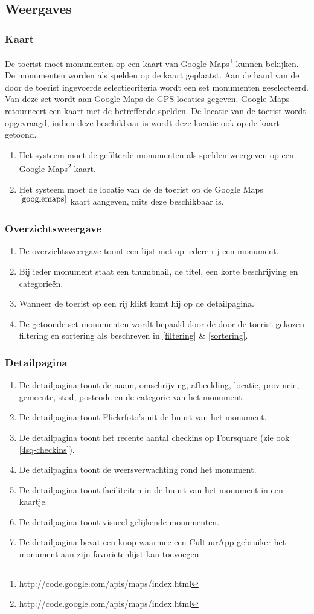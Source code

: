\documentclass[a4paper,10pt]{article}
\newcommand{\rsubsection}[1]{
\subsection{#1}\label{sec:sub:#1}
}
\newcommand{\rsubsubsection}[1]{
\subsubsection{#1}\label{sec:sub:sub:#1}
}
\begin{document}
	\rsubsection{Weergaves}
\rsubsubsection{Kaart}
			De toerist moet monumenten op een kaart van Google Maps\footnote{http://code.google.com/apis/maps/index.html} kunnen bekijken. De monumenten worden als spelden op de kaart geplaatst. Aan de hand van de door de toerist ingevoerde selectiecriteria wordt een set monumenten geselecteerd. Van deze set wordt aan Google Maps de GPS locaties gegeven. Google Maps retourneert een kaart met de betreffende spelden. De locatie van de toerist wordt opgevraagd, indien deze beschikbaar is wordt deze locatie ook op de kaart getoond.
			\begin{enumerate}
				\item Het systeem moet de gefilterde monumenten als spelden weergeven op een Google Maps\footnote{\label{googlemaps} http://code.google.com/apis/maps/index.html} kaart.
				\item Het systeem moet de locatie van de de toerist op de Google Maps$^{\ref{googlemaps}}$ kaart aangeven, mits deze beschikbaar is. 
			\end{enumerate}
		\rsubsubsection{Overzichtsweergave} \label{sec:views-detail}
\begin{enumerate}
				\item De overzichtsweergave toont een lijst met op iedere rij een monument.
\item Bij ieder monument staat een thumbnail, de titel, een korte beschrijving en categorie\"en.
\item Wanneer de toerist op een rij klikt komt hij op de detailpagina.
\item De getoonde set monumenten wordt bepaald door de door de toerist gekozen filtering en sortering als beschreven in \ref{filtering} \& \ref{sortering}.
			\end{enumerate}
		\rsubsubsection{Detailpagina} \label{sec:views-detail}
			\begin{enumerate}
				\item De detailpagina toont de naam, omschrijving, afbeelding, locatie, provincie, gemeente, stad, postcode en de categorie van het monument.
				\item De detailpagina toont Flickrfoto's uit de buurt van het monument.
		\item \label{views-checkins} De detailpagina toont het recente aantal checkins op Foursquare (zie ook \ref{4sq-checkins}).
				\item De detailpagina toont de weersverwachting rond het monument.
				\item De detailpagina toont faciliteiten in de buurt van het monument in een kaartje.
				\item De detailpagina toont visueel gelijkende monumenten.
				\item De detailpagina bevat een knop waarmee een CultuurApp-gebruiker het monument aan zijn favorietenlijst kan toevoegen.
			\end{enumerate}
			
\end{document}
